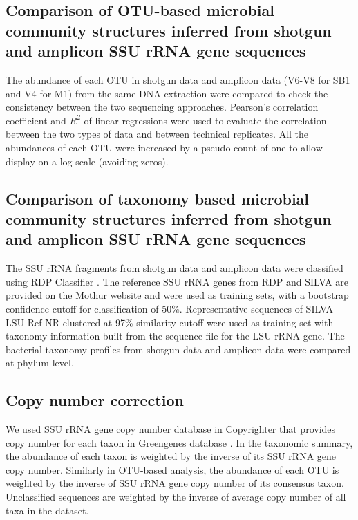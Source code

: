 \documentclass[]{msu-thesis}
\begin{document}
\subsection{Comparison of OTU-based microbial community structures inferred from shotgun and amplicon SSU rRNA gene sequences}
The abundance of each OTU in shotgun data and amplicon data (V6-V8 for SB1 and V4 for M1) from the same DNA extraction were compared to check the consistency between the two sequencing approaches. Pearson’s correlation coefficient and $R^2$ of linear regressions were used to evaluate the correlation between the two types of data and between technical replicates. All the abundances of each OTU were increased by a pseudo-count of one to allow display on a log scale (avoiding zeros). 

\subsection{Comparison of taxonomy based microbial community structures inferred from shotgun and amplicon SSU rRNA gene sequences}
The SSU rRNA fragments from shotgun data and amplicon data were classified using RDP Classifier \cite{wang_naive_2007}. The reference SSU rRNA genes from RDP and SILVA are provided on the Mothur website and were used as training sets, with a bootstrap confidence cutoff for classification of 50\%. Representative sequences of SILVA LSU Ref NR clustered at 97\% similarity cutoff were used as training set with taxonomy information built from the sequence file for the LSU rRNA gene. The bacterial taxonomy profiles from shotgun data and amplicon data were compared at phylum level.

\subsection{Copy number correction}
We used SSU rRNA gene copy number database in Copyrighter \cite{angly_copyrighter:_2014} that provides copy number for each taxon in Greengenes database \cite{desantis_greengenes_2006}. In the taxonomic summary, the abundance of each taxon is weighted by the inverse of its SSU rRNA gene copy number. Similarly in OTU-based analysis, the abundance of each OTU is weighted by the inverse of SSU rRNA gene copy number of its consensus taxon. Unclassified sequences are weighted by the inverse of average copy number of all taxa in the dataset.
\end{document}
